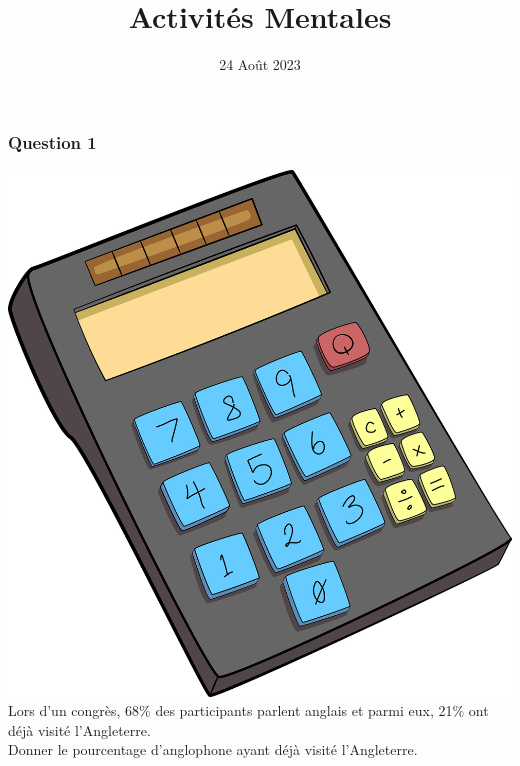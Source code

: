 \documentclass[15pt, mathserif]{beamer}
\title{Activités Mentales}
\date{24 Août 2023}
\begin{document}
\begin{frame}
    \titlepage
\end{frame}

\begin{frame} 
	\frametitle{Question 1}
\includegraphics[scale=0.01]{calculatrice} Lors d'un congrès, 68\% des participants parlent anglais et parmi eux, 21\% ont déjà visité l'Angleterre. \\ Donner le pourcentage d'anglophone ayant déjà visité l'Angleterre.\end{frame}
\end{document}

